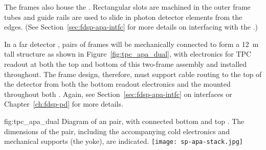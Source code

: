 
The  frames also house the .  %
Rectangular slots are machined in the outer frame tubes and guide rails are used to slide in photon detector elements from the edges. %
(See Section~\ref{sec:fdsp-apa-intfc} for more details on interfacing with the .)   

In a far detector , pairs of  frames will be mechanically connected to form a \SI{12}{m} tall structure as shown in Figure~\ref{fig:tpc_apa_dual}, with electronics for TPC readout at both the top and bottom of this two-frame assembly and  installed throughout.  The  frame design, therefore, must support cable routing to the top of the detector from both the bottom  readout electronics and the  mounted throughout both .  %
Again, see Section~\ref{sec:fdsp-apa-intfc} on interfaces or Chapter~\ref{ch:fdsp-pd} for more details.


\begin{dunefigure}{fig:tpc_apa_dual}
{Diagram of an  pair, with connected bottom and top . The dimensions of the  pair, including the accompanying cold electronics and mechanical supports (the yoke), are indicated.}
\texttt{[image: sp-apa-stack.jpg]} 
\end{dunefigure}

